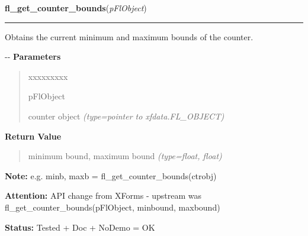 \hspace{.8\funcindent}\begin{boxedminipage}{\funcwidth}

    \raggedright \textbf{fl\_get\_counter\_bounds}(\textit{pFlObject})

    \vspace{-1.5ex}

    \rule{\textwidth}{0.5\fboxrule}
\setlength{\parskip}{2ex}

Obtains the current minimum and maximum bounds of the counter.

-{}-
\setlength{\parskip}{1ex}
      \textbf{Parameters}
      \vspace{-1ex}

      \begin{quote}
        \begin{Ventry}{xxxxxxxxx}

          \item[pFlObject]


counter object
            {\it (type=pointer to xfdata.FL\_OBJECT)}

        \end{Ventry}

      \end{quote}

      \textbf{Return Value}
    \vspace{-1ex}

      \begin{quote}

minimum bound, maximum bound
      {\it (type=float, float)}

      \end{quote}

\textbf{Note:} 
e.g. minb, maxb = fl\_get\_counter\_bounds(ctrobj)


\textbf{Attention:} 
API change from XForms - upstream was
fl\_get\_counter\_bounds(pFlObject, minbound, maxbound)


\textbf{Status:} 
Tested + Doc + NoDemo = OK


    \end{boxedminipage}

    \label{xformslib:flcounter:fl_get_counter_step}

    \vspace{0.5ex}


